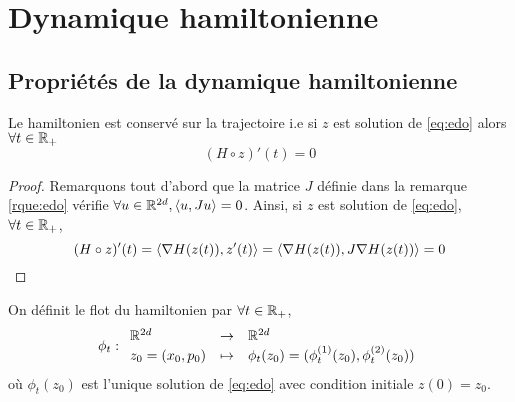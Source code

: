 \documentclass[10pt,a4paper]{article}
\begin{document}


\section{Dynamique hamiltonienne}

\subsection{Propriétés de la dynamique hamiltonienne}
\begin{Prop}\label{prop:conservation}
  Le hamiltonien est conservé sur la trajectoire i.e si $z$ est solution de \eqref{eq:edo} alors $\forall t \in \mathbb{R}_+$
  $$
  (H \circ z)'(t) = 0
  $$
\end{Prop}

\begin{proof}
  Remarquons tout d'abord que la matrice $J$ définie dans la remarque \ref{rque:edo} vérifie $\forall u \in \mathbb{R}^{2d}, { \left\langle u, Ju \right\rangle} = 0$. Ainsi, si $z$ est solution de \eqref{eq:edo}, $\forall t \in \mathbb{R}_+$, 
  $$
    (H \circ z)'(t) = { \left\langle \nabla H (z(t)), z'(t) \right\rangle} = { \left\langle \nabla H (z(t)), J \nabla H(z(t)) \right\rangle} = 0
  $$
\end{proof}

\begin{Def}
  On définit le flot du hamiltonien par $\forall t \in \mathbb{R}_+$,
  $$
  \phi_t : { \begin{array}{lcl} 
    \mathbb{R}^{2d} & \to & \mathbb{R}^{2d} \\
    z_0 = (x_0, p_0) &\mapsto & \phi_t(z_0) = (\phi_t^{(1)}(z_0), \phi_t^{(2)}(z_0))
     \end{array} }
  $$
  où $\phi_t(z_0)$ est l'unique solution de \eqref{eq:edo} avec condition initiale $z(0) = z_0$.
\end{Def}
  
\end{document}
